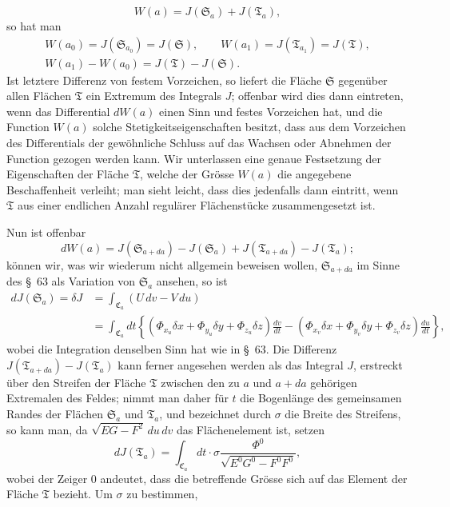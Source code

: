 \documentclass[11pt,a4paper,leqno]{article}
\begin{document}
\[
W(a)=J(\mathfrak{S}_a)+J(\mathfrak{T}_a),
\]
so hat man
\[
\begin{gathered}
W(a_0)=J(\mathfrak{S}_{a_0})=J(\mathfrak{S}),\qquad
W(a_1)=J(\mathfrak{T}_{a_1})=J(\mathfrak{T}),\\
W(a_1)-W(a_0)=J(\mathfrak{T})-J(\mathfrak{S}).
\end{gathered}
\]
Ist letztere Differenz von festem Vorzeichen, so liefert die Fläche
$\mathfrak{S}$ gegenüber allen Flächen $\mathfrak{T}$ ein Extremum des
Integrals $J$; offenbar wird dies dann eintreten, wenn das Differential
$dW(a)$ einen Sinn und festes Vorzeichen hat, und die Function $W(a)$ solche
Stetigkeitseigenschaften besitzt, dass aus dem Vorzeichen des Differentials
der gewöhnliche Schluss auf das Wachsen oder Abnehmen der Function gezogen
werden kann. Wir unterlassen eine genaue Festsetzung der Eigenschaften der
Fläche $\mathfrak{T}$, welche der Grösse $W(a)$ die angegebene Beschaffenheit
verleiht; man sieht leicht, dass dies jedenfalls dann eintritt, wenn
$\mathfrak{T}$ aus einer endlichen Anzahl regulärer Flächenstücke
zusammengesetzt ist.

Nun ist offenbar
\begin{equation}\tag{47}
dW(a)=J(\mathfrak{S}_{a+da})-J(\mathfrak{S}_a)
     +J(\mathfrak{T}_{a+da})-J(\mathfrak{T}_a);
\end{equation}
können wir, was wir wiederum nicht allgemein beweisen wollen,
$\mathfrak{S}_{a+da}$ im Sinne des \S~63 als Variation von
$\mathfrak{S}_a$ ansehen, so ist
\[
\begin{aligned}
dJ(\mathfrak{S}_a)=\delta J
&=\int_{\mathfrak{C}_a}(U\,dv-V\,du)\\
&=\int_{\mathfrak{C}_a}dt\left\{
(\Phi_{x_u}\delta x+\Phi_{y_u}\delta y+\Phi_{z_u}\delta z)\frac{dv}{dt}
-(\Phi_{x_v}\delta x+\Phi_{y_v}\delta y+\Phi_{z_v}\delta z)\frac{du}{dt}
\right\},
\end{aligned}
\]
wobei die Integration denselben Sinn hat wie in \S~63. Die Differenz
$J(\mathfrak{T}_{a+da})-J(\mathfrak{T}_a)$ kann ferner angesehen werden als
das Integral $J$, erstreckt über den Streifen der Fläche $\mathfrak{T}$
zwischen den zu $a$ und $a+da$ gehörigen Extremalen des Feldes; nimmt man
daher für $t$ die Bogenlänge des gemeinsamen Randes der Flächen
$\mathfrak{S}_a$ und $\mathfrak{T}_a$, und bezeichnet durch $\sigma$ die
Breite des Streifens, so kann man, da $\sqrt{EG-F^2}\,du\,dv$ das
Flächenelement ist, setzen
\[
dJ(\mathfrak{T}_a)=\int_{\mathfrak{C}_a}dt\cdot\sigma
\frac{\Phi^0}{\sqrt{E^0G^0-F^0F^0}},
\]
wobei der Zeiger $0$ andeutet, dass die betreffende Grösse sich auf das
Element der Fläche $\mathfrak{T}$ bezieht. Um $\sigma$ zu bestimmen,
\end{document}
